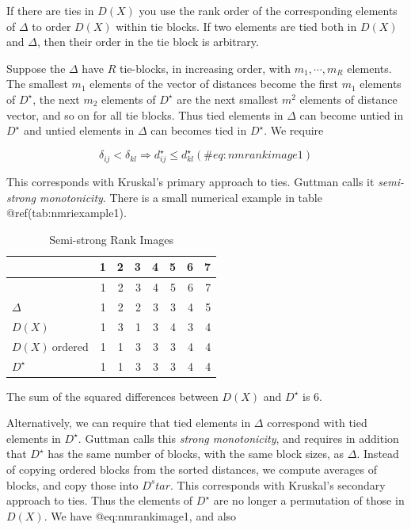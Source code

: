 \documentclass[
  12pt,
  letterpaper,
  DIV=11,
  numbers=noendperiod]{scrreprt}
\theoremstyle{remark}
\begin{document}
If there are ties in \(D(X)\) you use the rank order of the
corresponding elements of \(\Delta\) to order \(D(X)\) within tie
blocks. If two elements are tied both in \(D(X)\) and \(\Delta\), then
their order in the tie block is arbitrary.

Suppose the \(\Delta\) have \(R\) tie-blocks, in increasing order, with
\(m_1,\cdots,m_R\) elements. The smallest \(m_1\) elements of the vector
of distances become the first \(m_1\) elements of \(D^\star\), the next
\(m_2\) elements of \(D^\star\) are the next smallest \(m^2\) elements
of distance vector, and so on for all tie blocks. Thus tied elements in
\(\Delta\) can become untied in \(D^\star\) and untied elements in
\(\Delta\) can becomes tied in \(D^\star\). We require

\begin{equation}
\delta_{ij}<\delta_{kl}\Rightarrow d_{ij}^\star\leq d_{kl}^\star
(\#eq:nmrankimage1)
\end{equation}

This corresponds with Kruskal's primary approach to ties. Guttman calls
it \emph{semi-strong monotonicity}. There is a small numerical example
in table @ref(tab:nmriexample1).

\begin{longtable}[]{@{}lrrrrrrr@{}}
\caption{Semi-strong Rank Images}\tabularnewline
\toprule\noalign{}
& 1 & 2 & 3 & 4 & 5 & 6 & 7 \\
\midrule\noalign{}
\endfirsthead
\toprule\noalign{}
& 1 & 2 & 3 & 4 & 5 & 6 & 7 \\
\midrule\noalign{}
\endhead
\bottomrule\noalign{}
\endlastfoot
\(\Delta\) & 1 & 2 & 2 & 3 & 3 & 4 & 5 \\
\(D(X)\) & 1 & 3 & 1 & 3 & 4 & 3 & 4 \\
\(D(X)\ \text{ordered}\) & 1 & 1 & 3 & 3 & 3 & 4 & 4 \\
\(D^\star\) & 1 & 1 & 3 & 3 & 3 & 4 & 4 \\
\end{longtable}

The sum of the squared differences between \(D(X)\) and \(D^\star\) is
6.

Alternatively, we can require that tied elements in \(\Delta\)
correspond with tied elements in \(D^\star\). Guttman calls this
\emph{strong monotonicity}, and requires in addition that \(D^\star\)
has the same number of blocks, with the same block sizes, as \(\Delta\).
Instead of copying ordered blocks from the sorted distances, we compute
averages of blocks, and copy those into \(D^star\). This corresponds
with Kruskal's secondary approach to ties. Thus the elements of
\(D^\star\) are no longer a permutation of those in \(D(X)\). We have
@eq:nmrankimage1, and also
\end{document}
